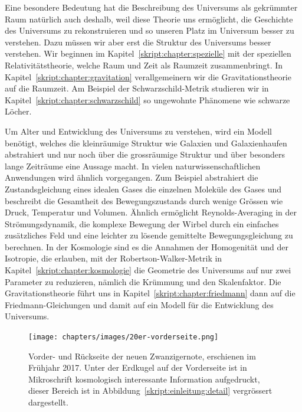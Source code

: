 Eine besondere Bedeutung hat die Beschreibung des Universums als gekrümmter
Raum natürlich auch deshalb, weil diese Theorie uns ermöglicht,
die Geschichte des Universums zu rekonstruieren und so
unseren Platz im Universum besser zu verstehen.
Dazu müssen wir aber erst die Struktur des Universums besser verstehen.
Wir beginnen im Kapitel~\ref{skript:chapter:spezielle} mit der
speziellen Relativitätstheorie, welche Raum und Zeit als Raumzeit
zusammenbringt.
In Kapitel~\ref{skript:chapter:gravitation} verallgemeinern wir die
Gravitationstheorie auf die Raumzeit.
Am Beispiel der Schwarzschild-Metrik studieren wir in
Kapitel~\ref{skript:chapter:schwarzschild} so ungewohnte Phänomene
wie schwarze Löcher.

Um Alter und Entwicklung des Universums zu verstehen,
wird ein Modell benötigt, welches die kleinräumige
Struktur wie Galaxien und Galaxienhaufen abstrahiert und nur noch
über die grossräumige Struktur und über besonders lange Zeiträume
eine Aussage macht.
In vielen naturwissenschaftlichen Anwendungen wird ähnlich vorgegangen.
Zum Beispiel abstrahiert die Zustandsgleichung eines idealen Gases
die einzelnen Moleküle des Gases und beschreibt die Gesamtheit des
Bewegungszustands durch wenige Grössen wie Druck, Temperatur und Volumen.
Ähnlich ermöglicht Reynolds-Averaging in der Strömungsdynamik, die 
komplexe Bewegung der Wirbel durch ein einfaches zusätzliches Feld und
eine leichter zu lösende gemittelte Bewegungsgleichung zu berechnen.
In der Kosmologie sind es die Annahmen der Homogenität und der Isotropie,
die erlauben, mit der Robertson-Walker-Metrik in
Kapitel~\ref{skript:chapter:kosmologie} die Geometrie des Universums auf
nur zwei Parameter zu reduzieren, nämlich die Krümmung und den Skalenfaktor.
Die Gravitationstheorie führt uns in Kapitel~\ref{skript:chapter:friedmann}
dann auf die Friedmann-Gleichungen und damit auf ein Modell für die
Entwicklung des Universums.

\begin{figure}
\centering
\texttt{[image: chapters/images/20er-vorderseite.png]}
\caption{Vorder- und Rückseite der neuen Zwanzigernote, erschienen
im Frühjahr 2017.
Unter der Erdkugel auf der Vorderseite ist in Mikroschrift kosmologisch
interessante Information aufgedruckt, dieser Bereich ist in
Abbildung~\ref{skript:einleitung:detail} vergrössert dargestellt.
\label{skript:einleitung:noten}}
\end{figure}

